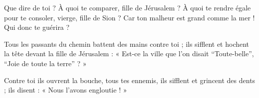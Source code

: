 Que dire de toi ? À quoi te comparer, fille de Jérusalem ? À quoi te rendre égale pour te consoler, vierge, fille de Sion ? Car ton malheur est grand comme la mer ! Qui donc te guérira ?

Tous les passants du chemin battent des mains contre toi ; ils sifflent et hochent la tête devant la fille de Jérusalem : « Est-ce la ville que l’on disait “Toute-belle”, “Joie de toute la terre” ? »

Contre toi ils ouvrent la bouche, tous tes ennemis, ils sifflent et grincent des dents ; ils disent : « Nous l’avons engloutie ! »